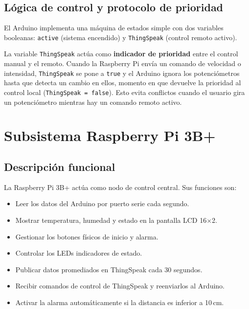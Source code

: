 \documentclass[12pt, a4paper]{article}
\begin{document}
\subsection{Lógica de control y protocolo de prioridad}

El Arduino implementa una máquina de estados simple con dos variables booleanas:
\texttt{active} (sistema encendido) y \texttt{ThingSpeak} (control remoto activo).

\begin{notatecnica}
La variable \texttt{ThingSpeak} actúa como \textbf{indicador de prioridad} entre
el control manual y el remoto. Cuando la Raspberry Pi envía un comando de velocidad
o intensidad, \texttt{ThingSpeak} se pone a \texttt{true} y el Arduino ignora los
potenciómetros hasta que detecta un cambio en ellos, momento en que devuelve la
prioridad al control local (\texttt{ThingSpeak = false}). Esto evita conflictos
cuando el usuario gira un potenciómetro mientras hay un comando remoto activo.
\end{notatecnica}

\newpage

\section{Subsistema Raspberry Pi 3B+}

\subsection{Descripción funcional}

La Raspberry Pi 3B+ actúa como nodo de control central. Sus funciones son:

\begin{itemize}[noitemsep]
    \item Leer los datos del Arduino por puerto serie cada segundo.
    \item Mostrar temperatura, humedad y estado en la pantalla LCD 16×2.
    \item Gestionar los botones físicos de inicio y alarma.
    \item Controlar los LEDs indicadores de estado.
    \item Publicar datos promediados en ThingSpeak cada 30 segundos.
    \item Recibir comandos de control de ThingSpeak y reenviarlos al Arduino.
    \item Activar la alarma automáticamente si la distancia es inferior a 10\,cm.
\end{itemize}
\end{document}
